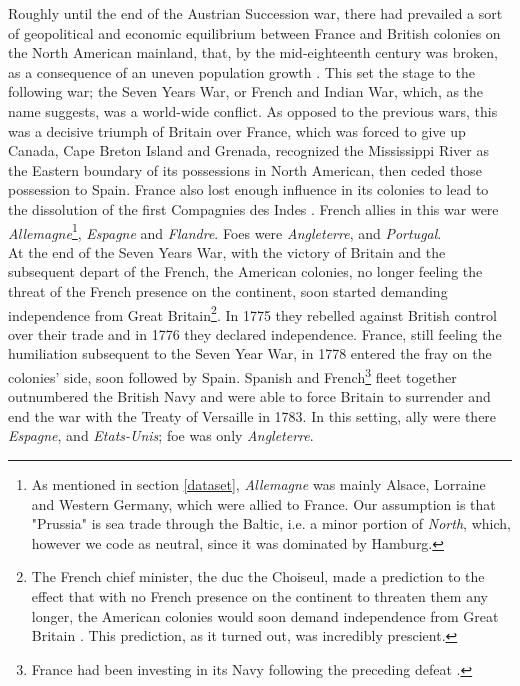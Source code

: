\documentclass[12pt,a4paper,notitlepage,english]{article}
\begin{document}
Roughly until the end of the Austrian Succession war, there had prevailed a sort of geopolitical and economic equilibrium between France and British colonies on the North American mainland, that, by the mid-eighteenth century was broken, as a consequence of an uneven population growth \citep{findlay2009power}. This set the stage to the following war; the Seven Years War, or French and Indian War, which, as the name suggests, was a world-wide conflict. As opposed to the previous wars, this was a decisive triumph of Britain over France, which was forced to give up Canada, Cape Breton Island and Grenada, recognized the Mississippi River as the Eastern boundary of its possessions in North American, then ceded those possession to Spain. France also lost enough influence in its colonies to lead to the dissolution of the first Compagnies des Indes \citep{riley_seven_1986}. French allies in this war were \textit{Allemagne}\footnote{As mentioned in section \ref{dataset}, \textit{Allemagne} was mainly Alsace, Lorraine and Western Germany, which were allied to France. Our assumption is that "Prussia" is sea trade through the Baltic, i.e. a minor portion of \textit{North}, which, however we code as neutral, since it was dominated by Hamburg.}, \textit{Espagne} and \textit{Flandre}. Foes were \textit{Angleterre}, and \textit{Portugal}. \\
At the end of the Seven Years War, with the victory of Britain and the subsequent depart of the French, the American colonies, no longer feeling the threat of the French presence on the continent, soon started demanding independence from Great Britain\footnote{The French chief minister, the duc the Choiseul, made a prediction to the effect that with no French presence on the continent to threaten them any longer, the American colonies would soon demand independence from Great Britain \citep{findlay2009power}. This prediction, as it turned out, was incredibly prescient.}.
In 1775 they rebelled against British control over their trade and in 1776 they declared independence. France, still feeling the humiliation subsequent to the Seven Year War, in 1778 entered the fray on the colonies' side, soon followed by Spain. Spanish and French\footnote{France had been investing in its Navy following the preceding defeat \citep{findlay2009power}.} fleet together outnumbered the British Navy and were able to force Britain to surrender and end the war with the Treaty of Versaille in 1783. 
In this setting, ally were there \textit{Espagne}, and \textit{Etats-Unis}; foe was only \textit{Angleterre}. \\
\end{document}
